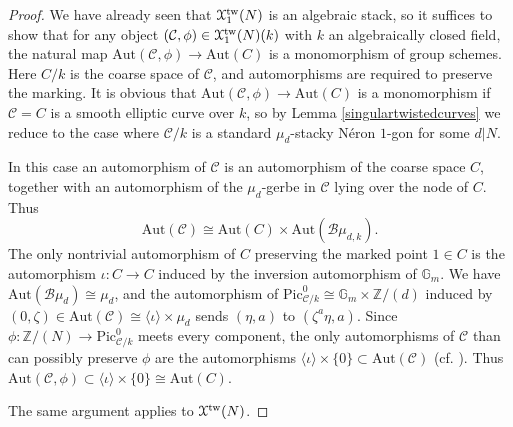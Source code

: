 \documentclass[11pt]{amsart}
\theoremstyle{definition}
\begin{document}
\begin{proof}
We have already seen that ${\mathbf{\EuScript{X}}}^{\mathrm{tw}}_1(N)$ is an algebraic stack, so it suffices to show that for any object $({\mathcal{C}},\phi) \in {\mathbf{\EuScript{X}}}^{\mathrm{tw}}_1(N)(k)$ with $k$ an algebraically closed field, the natural map $\mathrm{Aut}({\mathcal{C}},\phi) \rightarrow \mathrm{Aut}(C)$ is a monomorphism of group schemes. Here $C/k$ is the coarse space of ${\mathcal{C}}$, and automorphisms are required to preserve the marking. It is obvious that $\mathrm{Aut}({\mathcal{C}},\phi) \rightarrow \mathrm{Aut}(C)$ is a monomorphism if ${\mathcal{C}} = C$ is a smooth elliptic curve over $k$, so by Lemma \ref{singulartwistedcurves} we reduce to the case where ${\mathcal{C}}/k$ is a standard $\mu_d$-stacky N\'eron $1$-gon for some $d|N$.

\begin{center}
\end{center}

In this case an automorphism of ${\mathcal{C}}$ is an automorphism of the coarse space $C$, together with an automorphism of the $\mu_d$-gerbe in ${\mathcal{C}}$ lying over the node of $C$. Thus 
\begin{displaymath}
\mathrm{Aut}({\mathcal{C}}) \cong \mathrm{Aut}(C) \times \mathrm{Aut}({\mathcal{B}} \mu_{d,k}).
\end{displaymath}
The only nontrivial automorphism of $C$ preserving the marked point $1 \in C$ is the automorphism $\iota: C \rightarrow C$ induced by the inversion automorphism of $\mathbb{G}_m$. We have $\mathrm{Aut}({\mathcal{B}} \mu_d) \cong \mu_d$, and the automorphism of $\mathrm{Pic}^0_{{\mathcal{C}}/k} \cong \mathbb{G}_m \times \mathbb{Z}/(d)$ induced by $(0, \zeta) \in \mathrm{Aut}({\mathcal{C}}) \cong \langle \iota \rangle \times \mu_d$ sends $(\eta, a)$ to $(\zeta^a \eta, a)$. Since $\phi: \mathbb{Z}/(N) \rightarrow \mathrm{Pic}^0_{{\mathcal{C}}/k}$ meets every component, the only automorphisms of ${\mathcal{C}}$ than can possibly preserve $\phi$ are the automorphisms $\langle \iota \rangle \times \{0\} \subset \mathrm{Aut}({\mathcal{C}})$ (cf. \cite[proof of 3.1.8]{C}). Thus $\mathrm{Aut}({\mathcal{C}},\phi) \subset \langle \iota \rangle \times \{0\} \cong \mathrm{Aut}(C)$.

The same argument applies to ${\mathbf{\EuScript{X}}}^{\mathrm{tw}}(N)$.
\end{proof}
\end{document}
